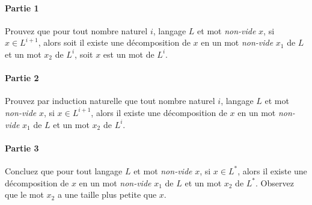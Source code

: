 \documentclass[12pt,french,a4paper]{article}
\begin{document}
\begin{question}

\paragraph{Partie 1}
Prouvez que pour tout nombre naturel $i$, langage $L$ et mot \textit{non-vide} $x$,
si $x \in L^{i + 1}$, alors soit il existe une décomposition de $x$ en un mot \textit{non-vide} $x_1$ de $L$ et un mot $x_2$ de $L^i$, soit $x$ est un mot de $L^i$.

\paragraph{Partie 2}
Prouvez par induction naturelle que tout nombre naturel $i$, langage $L$ et mot \textit{non-vide} $x$,
si $x \in L^{i + 1}$, alors il existe une décomposition de $x$ en un mot \textit{non-vide} $x_1$ de $L$ et un mot $x_2$ de $L^i$.

\paragraph{Partie 3}
Concluez que pour tout langage $L$ et mot \textit{non-vide} $x$,
si $x \in L^*$, alors il existe une décomposition de $x$ en un mot \textit{non-vide} $x_1$ de $L$ et un mot $x_2$ de $L^*$.
Observez que le mot $x_2$ a une taille plus petite que $x$.
\end{question}
\end{document}
